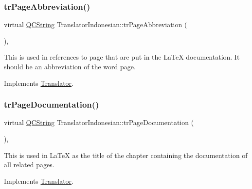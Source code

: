 \mbox{\label{class_translator_indonesian_a50544a68ed542dc4409c6aa6e0b13701}} 
\subsubsection{\texorpdfstring{trPageAbbreviation()}{trPageAbbreviation()}}
{\footnotesize\ttfamily virtual \mbox{\hyperlink{class_q_c_string}{Q\+C\+String}} Translator\+Indonesian\+::tr\+Page\+Abbreviation (\begin{DoxyParamCaption}{ }\end{DoxyParamCaption})\hspace{0.3cm}{\ttfamily [inline]}, {\ttfamily [virtual]}}

This is used in references to page that are put in the La\+TeX documentation. It should be an abbreviation of the word page. 

Implements \mbox{\hyperlink{class_translator}{Translator}}.

\mbox{\label{class_translator_indonesian_ac081cd516d83608c78ff5eae45c5ae54}} 
\subsubsection{\texorpdfstring{trPageDocumentation()}{trPageDocumentation()}}
{\footnotesize\ttfamily virtual \mbox{\hyperlink{class_q_c_string}{Q\+C\+String}} Translator\+Indonesian\+::tr\+Page\+Documentation (\begin{DoxyParamCaption}{ }\end{DoxyParamCaption})\hspace{0.3cm}{\ttfamily [inline]}, {\ttfamily [virtual]}}

This is used in La\+TeX as the title of the chapter containing the documentation of all related pages. 

Implements \mbox{\hyperlink{class_translator}{Translator}}.

\mbox{\label{class_translator_indonesian_a530538a2f5526dec0f8684932e4ac51f}} 
